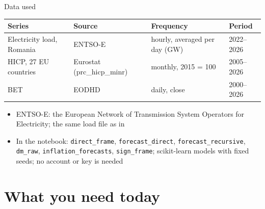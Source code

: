 \begin{frame}{Data used}
\itemsize{\small}
\begin{center}
\footnotesize
\begin{tabular}{llll}
\toprule
\textbf{Series} & \textbf{Source} & \textbf{Frequency} & \textbf{Period} \\
\midrule
Electricity load, Romania & ENTSO-E & hourly, averaged per day (GW) & 2022--2026 \\
HICP, 27 EU countries & Eurostat (prc\_hicp\_minr) & monthly, 2015 = 100 & 2005--2026 \\
BET & EODHD & daily, close & 2000--2026 \\
\bottomrule
\end{tabular}
\end{center}
\begin{itemize}
    \item ENTSO-E: the European Network of Transmission System Operators for Electricity; the same load file as in 
    \item In the notebook: \texttt{direct\_frame}, \texttt{forecast\_direct}, \texttt{forecast\_recursive}, \texttt{dm\_raw}, \texttt{inflation\_forecasts}, \texttt{sign\_frame}; scikit-learn models with fixed seeds; no account or key is needed
\end{itemize}
\end{frame}


\section{What you need today}

